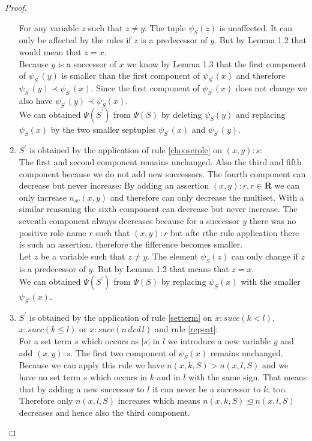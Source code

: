 \documentclass[a4paper,11pt]{scrartcl}
\theoremstyle{break}
\theoremstyle{definition}
\begin{document}
\begin{proof}
\begin{enumerate}
For any variable $z$ such that $z\neq y$. The tuple $\psi_S(z)$ is unaffected. It can only be affected by the rules if $z$ is a predecessor of $y$. But by Lemma 1.2 that would mean that $z=x$.\\
Because $y$ is a successor of $x$ we know by Lemma 1.3 that the first component of $\psi_{S^\prime}(y)$ is smaller than the first component of $\psi_{S^\prime}(x)$ and therefore $\psi_{S^\prime}(y)\prec\psi_{S^\prime}(x)$. Since the first component of $\psi_{S^\prime}(x)$ does not change we also have $\psi_{S^\prime}(y)\prec\psi_{S}(x)$.\\
We can obtained $\Psi(S^\prime)$ from $\Psi(S)$ by deleting $\psi_S(y)$ and replacing $\psi_S(x)$ by the two smaller septuples $\psi_{S^\prime}(x)$ and $\psi_{S^\prime}(y)$.
\item $S^\prime$ is obtained by the application of rule \ref{chooserole} on $(x,y):s$:\\
The first and second component remains unchanged. Also the third and fifth component because we do not add new successors. The fourth component can decrease but never increase: By adding an assertion $(x,y):r, r\in\mathbf{R}$ we can only increase $n_{sc}(x,y)$ and therefore can only decrease the multiset. With a similar reasoning the sixth component can decrease but never increase. The seventh component always decreases because for a successor $y$ there was no positive role name $r$ such that $(x,y):r$ but afte rthe rule application there is such an assertion. therefore the fifference becomes smaller.\\
Let $z$ be a variable such that $z\neq y$. The element $\psi_S(z)$ can only change if $z$ is a predecessor of $y$. But by Lemma 1.2 that means that $z=x$.\\
We can obtained $\Psi(S^\prime)$ from $\Psi(S)$ by replacing $\psi_S(x)$ with the smaller $\psi_{S^\prime}(x)$.
\item $S^\prime$ is obtained by the application of rule \ref{setterm} on $x:succ(k<l)$, $x:succ(k\leq l)$ or $x:succ(n\,dvd\,l)$ and rule \ref{repeat}:\\ 
For a set term $s$ which occurs as $|s|$ in $l$ we introduce a new variable $y$ and add $(x,y):s$. The first two component of $\psi_S(x)$ remains unchanged. Because we can apply this rule we have $n(x,k,S)>n(x,l,S)$ and we have no set term $s$ which occurs in $k$ and in $l$ with the same sign. That means that by adding a new successor to $l$ it can never be a successor to $k$, too. Therefore only $n(x,l,S)$ increases which means $n(x,k,S)\unlhd n(x,l,S)$ decreases and hence also the third component.\\

\end{enumerate}
\end{proof}
\end{document}
